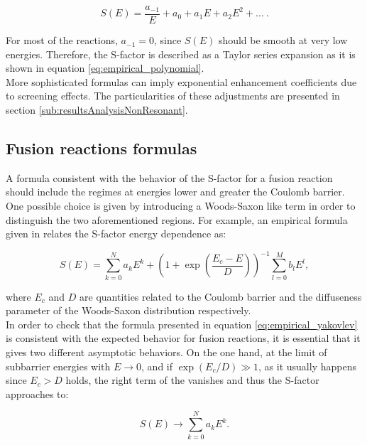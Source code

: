 \documentclass[openany]{book}
\begin{document}
\begin{equation}  \label{eq:empirical_laurent}
	S(E) =\frac{ a_{-1}}{E} + a_0 + a_1 E + a_2 E^2 + ... \ .
\end{equation}

For most of the reactions, $a_{-1} = 0$, since $S(E)$ should be smooth at very low energies. Therefore, the S-factor is  described as a Taylor series expansion as it is shown in equation \ref{eq:empirical_polynomial}. \\

More sophisticated formulas can imply exponential enhancement coefficients due to screening effects. The particularities of these adjustments are presented in section \ref{sub:resultsAnalysisNonResonant}. 

\subsection{Fusion reactions formulas} \label{sub:empirical_fusion}

A formula consistent with the behavior of the S-factor for a  fusion reaction should include the regimes at energies lower and greater the Coulomb barrier. One possible choice is given by introducing a Woods-Saxon like term in order to distinguish the two aforementioned regions. For example, an empirical formula given in  \cite{beard_afanasjev_chamon_gasques_wiescher_yakovlev_2010} relates the S-factor energy dependence as:

\begin{equation} \label{eq:empirical_yakovlev}
	S(E) = \sum_{k=0}^{N} {a_kE^k} + \left(1 + \exp{\left( \frac{E_c - E}{D}\right)}\right)^{-1} \sum_{l=0}^{M} {b_lE^l},
\end{equation}

where $E_c$ and $D$ are quantities related to the Coulomb barrier and the diffuseness parameter of the Woods-Saxon distribution respectively. \\

In order to check that the formula presented in equation \ref{eq:empirical_yakovlev} is consistent with the expected behavior for fusion reactions, it is essential that it gives two different asymptotic behaviors. On the one hand, at the limit of subbarrier energies with $E \rightarrow 0 $, and if $\exp {(E_c/D)} \gg 1$, as it usually happens since $E_c > D$ holds, the right term of the  vanishes and thus the S-factor approaches to: 

\begin{equation} \label{eq:empirical_yakovlev_0}
	S(E) \rightarrow \sum_{k=0}^{N} {a_kE^k}. 
\end{equation}
\end{document}
